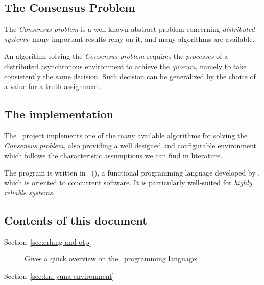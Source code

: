 \subsection{The Consensus Problem}

The \emph{Consensus problem} is a well-known abstract problem concerning
\emph{distributed systems}: many important results relay on it, and many
algorithms are available.

An algorithm solving the \emph{Consensus problem} requires the
\emph{processes} of a distributed asynchronous environment to achieve the
\emph{quorum}, namely to take consistently the same decision. Such
decision can be generalized by the choice of a value for a truth
assignment.

\subsection{The implementation}

The \YUNA\ project implements one of the many available algorithms for
solving the \emph{Consensus problem}, also providing a well designed and
configurable environment which follows the characteristic assumptions we
can find in literature.

The program is written in \Erlang\ (), a functional
programming language developed by , which is oriented to
concurrent software. It is particularly well-suited for \emph{highly
reliable systems}.

\subsection{Contents of this document}

\begin{description}

\item[Section~\ref{sec:erlang-and-otp}] Gives a quick overview on the
    \Erlang\ programming language;

\item[Section~\ref{sec:the-yuna-environment}]

\end{description}
